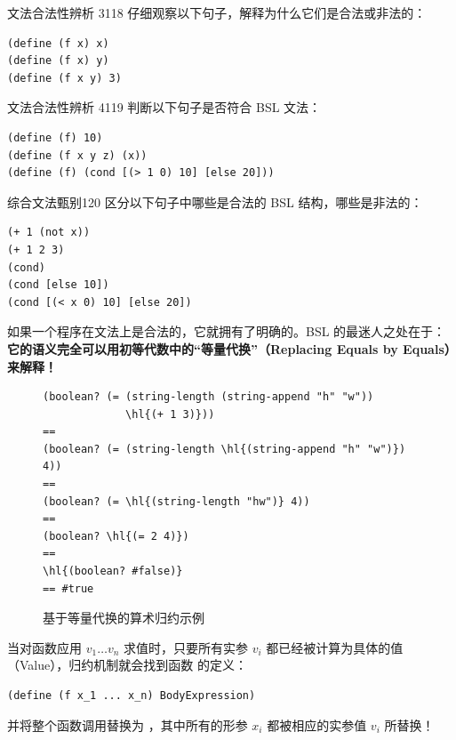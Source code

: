 \begin{exercise}{文法合法性辨析 3}{118}
仔细观察以下句子，解释为什么它们是合法或非法的：
\begin{lstlisting}[language=BSL]
(define (f x) x)
(define (f x) y)
(define (f x y) 3)
\end{lstlisting}
\end{exercise}

\begin{exercise}{文法合法性辨析 4}{119}
判断以下句子是否符合 BSL 文法：
\begin{lstlisting}[language=BSL]
(define (f) 10)
(define (f x y z) (x))
(define (f) (cond [(> 1 0) 10] [else 20]))
\end{lstlisting}
\end{exercise}

\begin{exercise}{综合文法甄别}{120}
区分以下句子中哪些是合法的 BSL 结构，哪些是非法的：
\begin{lstlisting}[language=BSL]
(+ 1 (not x))
(+ 1 2 3)
(cond)
(cond [else 10])
(cond [(< x 0) 10] [else 20])
\end{lstlisting}
\end{exercise}

\label{sec:int01_meaning}

如果一个程序在文法上是合法的，它就拥有了明确的。BSL 的最迷人之处在于：\textbf{它的语义完全可以用初等代数中的“等量代换”（Replacing Equals by Equals）来解释！}

\begin{figure}[htbp]
  \centering
\begin{stepperbox}[unbreakable]
\begin{Verbatim}[commandchars=\\\{\}, fontsize=\scriptsize]
(boolean? (= (string-length (string-append "h" "w"))
             \hl{(+ 1 3)}))
==
(boolean? (= (string-length \hl{(string-append "h" "w")}) 4))
==
(boolean? (= \hl{(string-length "hw")} 4))
==
(boolean? \hl{(= 2 4)})
==
\hl{(boolean? #false)}
== #true
\end{Verbatim}
\end{stepperbox}
  \caption{基于等量代换的算术归约示例}
  \label{fig:equals_by_equals}
\end{figure}

当对函数应用  $v_1 \dots v_n$\code{)} 求值时，只要所有实参 $v_i$ 都已经被计算为具体的值（Value），归约机制就会找到函数  的定义：
\begin{lstlisting}[language=BSL]
(define (f x_1 ... x_n) BodyExpression)
\end{lstlisting}
并将整个函数调用替换为 ，其中所有的形参 $x_i$ 都被相应的实参值 $v_i$ 所替换！


